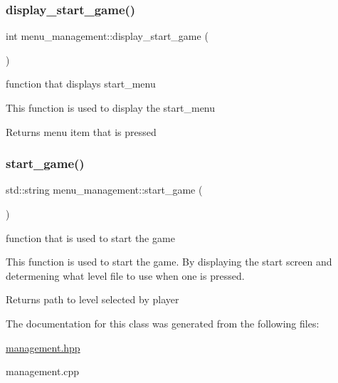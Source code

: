 \subsubsection{\texorpdfstring{display\+\_\+start\+\_\+game()}{display\_start\_game()}}
{\footnotesize\ttfamily int menu\+\_\+management\+::display\+\_\+start\+\_\+game (\begin{DoxyParamCaption}{ }\end{DoxyParamCaption})}



function that displays start\+\_\+menu 

This function is used to display the start\+\_\+menu

\begin{DoxyReturn}{Returns}
menu item that is pressed 
\end{DoxyReturn}
\mbox{\label{classmenu__management_a92d22f059d33ccc5c3ae485804fd5fbb}} 
\subsubsection{\texorpdfstring{start\+\_\+game()}{start\_game()}}
{\footnotesize\ttfamily std\+::string menu\+\_\+management\+::start\+\_\+game (\begin{DoxyParamCaption}{ }\end{DoxyParamCaption})}



function that is used to start the game 

This function is used to start the game. By displaying the start screen and determening what level file to use when one is pressed.

\begin{DoxyReturn}{Returns}
path to level selected by player 
\end{DoxyReturn}


The documentation for this class was generated from the following files\+:\begin{DoxyCompactItemize}
\item 
\hyperlink{management_8hpp}{management.\+hpp}\item 
management.\+cpp\end{DoxyCompactItemize}

